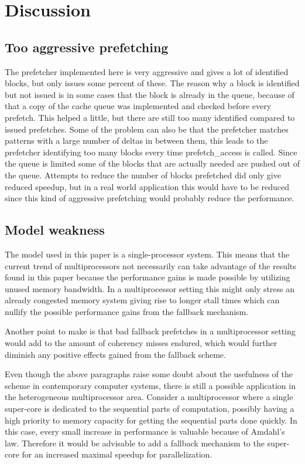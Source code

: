 \documentclass[12pt,journal,compsoc]{IEEEtran}
\begin{document}
\section{Discussion}

\subsection{Too aggressive prefetching}
The prefetcher implemented here is very aggressive and gives a lot of
identified blocks, but only issues some percent of these. The reason why a
block is identified but not issued is in some cases that the block is already
in the queue, because of that a copy of the cache queue was implemented
and checked before every prefetch. This helped a little, but there are still
too many identified compared to issued prefetches. Some of the problem can
also be that the prefetcher matches patterns with a large number of deltas
in between them, this leads to the prefetcher identifying too many blocks every
time prefetch\_access is called. Since the queue is limited some of the
blocks that are actually needed are pushed out of the queue. Attempts to
reduce the number of blocks prefetched did only give reduced speedup, but
in a real world application this would have to be reduced since this kind of
aggressive prefetching would probably reduce the performance.

\subsection{Model weakness}
The model used in this paper is a single-processor system.
This means that the current trend of multiprocessors not
necessarily can take advantage of the results found in
this paper because the performance gains is made possible
by utilizing unused memory bandwidth. In a multiprocessor
setting this might only stress an already congested memory
system giving rise to longer stall times which can nullify
the possible performance gains from the fallback mechanism.

Another point to make is that bad fallback prefetches in a
multiprocessor setting would add to the amount of coherency
misses endured, which would further diminish any positive
effects gained from the fallback scheme.

Even though the above paragraphs raise some doubt about
the usefulness of the scheme in contemporary computer systems,
there is still a possible application in the heterogeneous
multiprocessor area. Consider a multiprocessor where a single super-core
is dedicated to the sequential parts of computation, possibly having a
high priority to memory capacity for getting the sequential parts done quickly.
In this case, every small increase in performance is valuable
because of Amdahl's law. Therefore it would be advisable to add
a fallback mechanism to the super-core for an increased maximal
speedup for parallelization.
\end{document}
